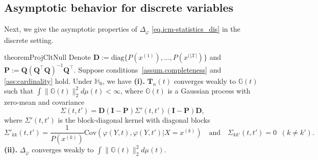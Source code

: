 \documentclass[
  12pt]{article}
\def\D{\mathbf{D}}
\def\I{\mathbf{I}}
\def\P{\mathbf{P}}
\def\Q{\mathbf{Q}}
\def\T{\mathbf{T}}
\def\mG{\mathbb{G}}
\begin{document}
\subsection{Asymptotic behavior for discrete variables}
\label{sec. asymptotic_discrete}
Next, we give the asymptotic properties of $\Delta_{\varphi}$ \eqref{eq.icm-statistics_dis} in the discrete setting. 
\begin{restatable}{theorem}{ProjCltNull}
\label{thm:proj-clt_null}
Denote $\D:=\mathrm{diag}\{P(x^{(1)}),...,P(x^{(|\mathcal{X}|})\}$ and $\P:=\Q(\Q^\top\Q)^{-1}\Q^\top$. Suppose conditions~\ref{assum.completeness} and \ref{ass:cardinality} hold. Under $\mathbb H_0$, we have \textbf{(i).} $\T_n(t)$ converges weakly to $\mathbb{G}(t)$ such that $\int \|\mG(t)\|_2^2 d\mu(t) < \infty$, where $\mathbb{G}(t)$ is a Gaussian process with zero-mean and covariance
$$
\Sigma(t,t')=\D(\I-\P)\Sigma'(t,t')(\I-\P)\D,
$$
where $\Sigma'(t,t')$ is the block-diagonal kernel with diagonal blocks
$$
\Sigma'_{k k}(t,t')=\frac{1}{P(x^{(k)})}\mathrm{Cov}(\varphi(Y,t),\varphi(Y,t')| X=x^{(k)})
\quad\text{and}\quad \Sigma_{k k'}(t,t')=0\;\;(k\neq k').
$$
\textbf{(ii).} $\Delta_{\varphi}$ converges weakly to $\int{\| \mathbb{G}(t)\|_2^2d\mu(t)}$.
\end{restatable}
\end{document}
